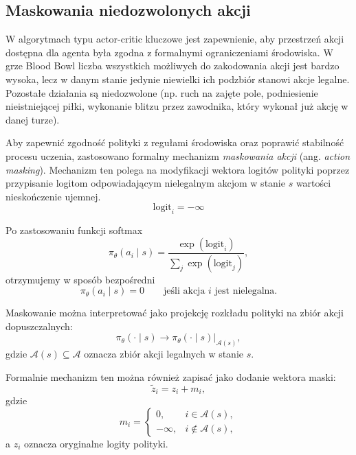 \subsection*{Maskowania niedozwolonych akcji}

W algorytmach typu actor-critic kluczowe jest zapewnienie, aby przestrzeń akcji dostępna dla agenta była zgodna z formalnymi ograniczeniami środowiska. W grze Blood Bowl liczba wszystkich możliwych do zakodowania akcji jest bardzo wysoka, lecz w danym stanie jedynie niewielki ich podzbiór stanowi akcje legalne. Pozostałe działania są niedozwolone (np. ruch na zajęte pole, podniesienie nieistniejącej piłki, wykonanie blitzu przez zawodnika, który wykonał już akcję w danej turze).

Aby zapewnić zgodność polityki z regułami środowiska oraz poprawić stabilność procesu uczenia, zastosowano formalny mechanizm \emph{maskowania akcji} (ang. \emph{action masking}). Mechanizm ten polega na modyfikacji wektora logitów polityki poprzez przypisanie logitom odpowiadającym nielegalnym akcjom w stanie $s$ wartości nieskończenie ujemnej.
\begin{equation}
	\text{logit}_i = -\infty 
\end{equation}

Po zastosowaniu funkcji softmax
\begin{equation}
	\pi_{\theta}(a_i \mid s) = \frac{\exp(\text{logit}_i)}{\sum_{j} \exp(\text{logit}_j)},
\end{equation}
otrzymujemy w sposób bezpośredni
\begin{equation}
	\pi_{\theta}(a_i \mid s) = 0 \qquad \text{jeśli akcja } i \text{ jest nielegalna.}
\end{equation}

Maskowanie można interpretować jako projekcję rozkładu polityki na zbiór akcji dopuszczalnych:
\begin{equation}
	\pi_\theta(\cdot \mid s) \longrightarrow \pi_\theta(\cdot \mid s)\big|_{\mathcal{A}(s)},
\end{equation}
gdzie \( \mathcal{A}(s) \subseteq \mathcal{A} \) oznacza zbiór akcji legalnych w stanie \( s \).

Formalnie mechanizm ten można również zapisać jako dodanie wektora maski:
\begin{equation}
	\tilde{z}_i = z_i + m_i,
\end{equation}
gdzie
\begin{equation}
	m_i =
	\begin{cases}
		0, & i \in \mathcal{A}(s), \\
		-\infty, & i \notin \mathcal{A}(s),
	\end{cases}
\end{equation}
a \( z_i \) oznacza oryginalne logity polityki.

